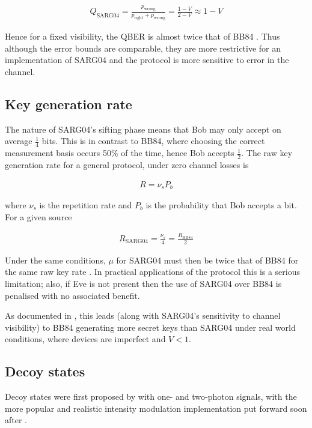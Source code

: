\documentclass[paper=a4, fontsize=11pt]{scrartcl} %
\numberwithin{equation}{section} %
\numberwithin{figure}{section} %
\numberwithin{table}{section} %
\begin{document}
\begin{align}
	Q_{\mathrm{SARG04}} =
	\frac{p_{\mathrm{wrong}}}{p_{\mathrm{right}} + p_{\mathrm{wrong}}}
	= \frac{1-V}{2-V}
	\approx 1-V
\end{align}

Hence for a fixed visibility, the QBER is almost twice that of BB84 \citep{branciardSARG04}. Thus although the error bounds
are comparable, they are more restrictive for an implementation of SARG04 and the protocol is more sensitive to error in the channel.

\subsection{Key generation rate}
The nature of SARG04's sifting phase means that Bob may only accept on average $\frac{1}{4}$ bits. This is in contrast to BB84, where
choosing the correct measurement basis occurs 50\% of the time, hence Bob accepts $\frac{1}{2}$. The raw key generation rate for a general protocol,
under zero channel losses is

\begin{align}
R = \nu_s P_b
\end{align}

where $\nu_s$ is the repetition rate and $P_b$ is the probability that Bob accepts a bit. For a given source

\begin{align}
	R_{\mathrm{SARG04}} = \frac{\nu_s}{4} = \frac{R_{\mathrm{BB84}}}{2}
\end{align}

Under the same conditions, $\mu$ for SARG04 must then be twice that of BB84 for the same raw key rate \citep{perf2protocols, SARG04orig}.
In practical applications of the protocol this is a serious limitation; also, if Eve is not present then the use of SARG04 over BB84 is penalised
with no associated benefit.

As documented in \citet{experimentalComparison}, this leads (along with SARG04's sensitivity to channel visibility) to BB84 generating
more secret keys than SARG04 under real world conditions, where devices are imperfect and $V < 1$.

\subsection{Decoy states}
Decoy states were first proposed by \citet{decoyOrig} with one- and two-photon signals, with the more popular and realistic
intensity modulation implementation put forward soon after \citep{lo2005}.
\end{document}
